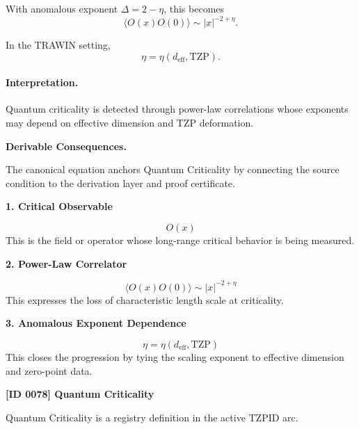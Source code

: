With anomalous exponent $\Delta=2-\eta$, this becomes
\begin{equation}
\boxed{
\langle O(x)O(0)\rangle
\sim
|x|^{-2+\eta}.
}
\end{equation}

In the TRAWIN setting,
\begin{equation}
\eta=\eta(d_{\mathrm{eff}},\mathrm{TZP}).
\end{equation}

\paragraph{Interpretation.}
Quantum criticality is detected through power-law correlations whose exponents may depend on effective dimension and TZP deformation.

\par\vspace{0.35em}
\noindent\textbf{Derivable Consequences.}\quad
\begingroup
\footnotesize
\raggedright
The canonical equation anchors Quantum Criticality by connecting the source condition to the derivation layer and proof certificate.
\par\endgroup

\noindent\textbf{1. Critical Observable}\par
\[
O(x)
\]
\noindent This is the field or operator whose long-range critical behavior is being measured.\par
\noindent\textbf{2. Power-Law Correlator}\par
\[
\langle O(x)O(0)\rangle
\sim
\lvert x\rvert^{-2+\eta}
\]
\noindent This expresses the loss of characteristic length scale at criticality.\par
\noindent\textbf{3. Anomalous Exponent Dependence}\par
\[
\eta = \eta(d_{\mathrm{eff}},\mathrm{TZP})
\]
\noindent This closes the progression by tying the scaling exponent to effective dimension and zero-point data.\par

\clearpage
\noindent\textbf{[ID 0078] Quantum Criticality}\par
\vspace{0.35em}
\begingroup\small
{}
Quantum Criticality is a registry definition in the active TZPID arc.

